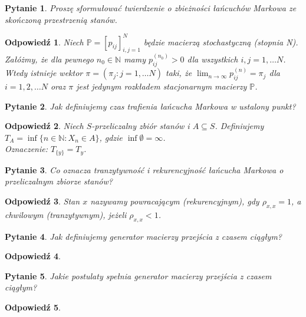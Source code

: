 \documentclass[12pt]{mwart}
\theoremstyle{plain}
\newtheorem{pytanie}{Pytanie}
\theoremstyle{break}
\newtheorem*{odpowiedź}{Odpowiedź}
\begin{document}
\begin{pytanie}
Proszę sformułować twierdzenie o zbieżności łańcuchów Markowa ze skończoną przestrzenią stanów.
\end{pytanie}
\begin{odpowiedź}
    Niech $\mathbb{P} = [p_{ij}]_{i,j=1}^N$
    będzie macierzą stochastyczną (stopnia  N).
    Załóżmy, że dla pewnego $n_0\in \mathbb{N}$
    mamy $p_{ij}^{(n_0)} > 0$ dla wszystkich $i, j=1, \ldots N$.
    Wtedy istnieje wektor $\pi = (\pi_j: j = 1, \ldots N)$
    taki, że $\lim_{n\to \infty}p^{(n)}_{ij} = \pi_j$ dla
    $i = 1, 2, \ldots N$ oraz $\pi$ jest jedynym rozkładem
    stacjonarnym macierzy $\mathbb{P}$.
\end{odpowiedź}


\begin{pytanie}
Jak definiujemy czas trafienia łańcucha Markowa w ustalony punkt?
\end{pytanie}
\begin{odpowiedź}
    Niech $S$-przeliczalny zbiór stanów i $A\subseteq S$.
    Definiujemy $T_A=\inf\{n\in \mathbb{N} : X_n\in A\}$,
    gdzie $\inf{\emptyset} = \infty$.\\
    Oznaczenie: $T_{\{y\}} = T_y$.
\end{odpowiedź}


\begin{pytanie}
Co oznacza tranzytywność i rekurencyjność łańcucha Markowa o przeliczalnym zbiorze stanów?
\end{pytanie}
\begin{odpowiedź}
    Stan $x$ nazywamy powracającym (rekurencyjnym),
    gdy $\rho_{x,x} = 1$,
    a chwilowym (tranzytywnym), jeżeli $\rho_{x,x} < 1$.
\end{odpowiedź}


\begin{pytanie}
Jak definiujemy generator macierzy przejścia z czasem ciągłym?
\end{pytanie}
\begin{odpowiedź}
\end{odpowiedź}


\begin{pytanie}
Jakie postulaty spełnia generator macierzy przejścia z czasem ciągłym?
\end{pytanie}
\begin{odpowiedź}
\end{odpowiedź}
\end{document}
